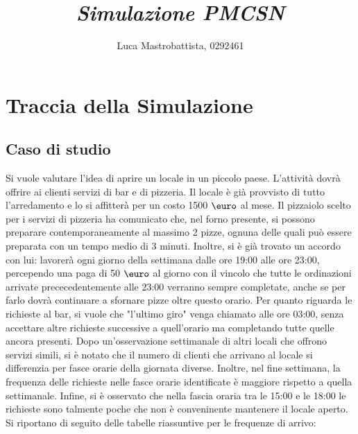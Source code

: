 \documentclass[a4paper, 12pt]{article}
\begin{document}
\title{
    \textbf{    
        \emph{Simulazione PMCSN}
    }
}
\author{Luca Mastrobattista, 0292461}
\date{} %
\maketitle  



\tableofcontents

\newpage
\section{Traccia della Simulazione}
\subsection{Caso di studio}
Si vuole valutare l'idea di aprire un locale in un piccolo paese. L'attività dovrà offrire ai clienti servizi di bar e di pizzeria. Il locale è già provvisto di tutto l'arredamento e lo si affitterà per un costo 1500 $\mbox{\euro}$ al mese. Il pizzaiolo scelto per i servizi di pizzeria ha comunicato che, nel forno presente, si possono preparare contemporaneamente al massimo 2 pizze, ognuna delle quali può essere preparata con un tempo medio di 3 minuti. Inoltre, si è già trovato un accordo con lui: lavorerà ogni giorno della settimana dalle ore 19:00 alle ore 23:00, percependo una paga di 50 $\mbox{\euro}$ al giorno con il vincolo che tutte le ordinazioni arrivate prececedentemente alle 23:00 
verranno sempre completate, anche se per farlo dovrà continuare a sfornare pizze oltre questo orario. Per quanto riguarda le richieste al bar, si vuole che "l'ultimo giro" venga chiamato alle ore 03:00, senza accettare altre richieste successive a quell'orario ma completando tutte quelle ancora presenti. \newline
Dopo un'osservazione settimanale di altri locali che offrono servizi simili, si è notato che il numero di clienti che arrivano al locale si differenzia per fasce orarie della giornata diverse. Inoltre, nel fine settimana, la frequenza delle richieste nelle fasce orarie identificate è maggiore rispetto a quella settimanale. Infine, si è osservato che nella fascia oraria tra le 15:00 e le 18:00 le richieste sono talmente poche che non è conveninente mantenere il locale aperto. Si riportano di seguito delle tabelle riassuntive per le frequenze di arrivo:
\end{document}
